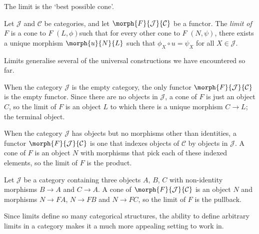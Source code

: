 The limit is the `best possible cone'.

\begin{definition}[Limit]
    Let \(\mathcal{J}\) and \(\mathcal{C}\) be categories, and let
    \(\morph{F}{\mathcal{J}}{\mathcal{C}}\) be a functor.
    The \emph{limit of \(F\)} is a cone to \(F\) \((L,\phi) \)such that for
    every other cone to \(F\) \((N, \psi)\), there exists a unique morphism
    \(\morph{u}{N}{L}\) such that \(\phi_X \circ u = \psi_X\) for all
    \(X \in \mathcal{J}\).
    \begin{center}
        
    \end{center}
\end{definition}

Limits generalise several of the universal constructions we have encountered so
far.

\begin{example}\label{ex:terminal-limit}
    When the category \(\mathcal{J}\) is the empty category, the only functor
    \(\morph{F}{\mathcal{J}}{\mathcal{C}}\) is the empty functor.
    Since there are no objects in \(\mathcal{J}\), a cone of \(F\) is just an
    object \(C\), so the limit of \(F\) is an object \(L\) to which there is a
    unique morphism \(C \to L\); the terminal object.
\end{example}

\begin{example}[Products]\label{ex:product-limit}
    When the category \(\mathcal{J}\) has objects but no morphisms other than
    identities, a functor \(\morph{F}{\mathcal{J}}{\mathcal{C}}\) is one that
    indexes objects of \(\mathcal{C}\) by objects in \(\mathcal{J}\).
    A cone of \(F\) is an object \(N\) with morphisms that pick each of these
    indexed elements, so the limit of \(F\) is the product.
\end{example}

\begin{example}[Pullbacks]\label{ex:pullback-limit}
    Let \(\mathcal{J}\) be a category containing three objects \(A\), \(B\),
    \(C\) with non-identity morphisms \(B \to A\) and \(C \to A\).
    A cone of \(\morph{F}{\mathcal{J}}{\mathcal{C}}\) is an object \(N\) and
    morphisms \(N \to FA\), \(N \to FB\) and \(N \to FC\), so the limit of
    \(F\) is the pullback.
\end{example}

Since limits define so many categorical structures, the ability to define
arbitrary limits in a category makes it a much more appealing setting to work
in.

